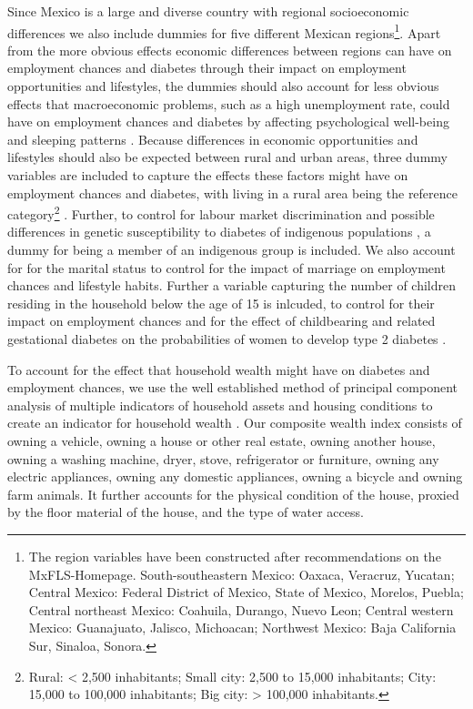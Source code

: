 Since Mexico is a large and diverse country with regional socioeconomic differences
we also include dummies for five different Mexican regions\footnote{The region variables have been constructed after recommendations on
the MxFLS-Homepage. South-southeastern Mexico: Oaxaca, Veracruz, Yucatan;
Central Mexico: Federal District of Mexico, State of Mexico, Morelos,
Puebla; Central northeast Mexico: Coahuila, Durango, Nuevo Leon; Central
western Mexico: Guanajuato, Jalisco, Michoacan; Northwest Mexico:
Baja California Sur, Sinaloa, Sonora.}. Apart from the more obvious effects economic differences between
regions can have on employment chances and diabetes through their
impact on employment opportunities and lifestyles, the dummies should
also account for less obvious effects that macroeconomic problems,
such as a high unemployment rate, could have on employment chances
and diabetes by affecting psychological well-being and sleeping patterns
\parencite{Antillon2014}. Because differences in economic opportunities
and lifestyles should also be expected between rural and urban areas,
three dummy variables are included to capture the effects these factors
might have on employment chances and diabetes, with living in a rural
area being the reference category\footnote{Rural: < 2,500 inhabitants; Small city: 2,500 to 15,000 inhabitants;
City: 15,000 to 100,000 inhabitants; Big city: > 100,000 inhabitants. } \parencite{Villalpando2010}. Further, to control for labour market discrimination
and possible differences in genetic susceptibility to diabetes of
indigenous populations \parencite{Yu2007}, a dummy for being a member
of an indigenous group is included. We also account for for the marital
status to control for the impact of marriage on employment chances
and lifestyle habits. Further a variable capturing the number of children
residing in the household below the age of 15 is inlcuded, to control
for their impact on employment chances and for the effect of childbearing
and related gestational diabetes on the probabilities of women to
develop type 2 diabetes \parencite{Bellamy2009}. 

To account for the effect that household wealth might have on diabetes and employment chances,
we use the well established method of principal component analysis
of multiple indicators of household assets and housing conditions
to create an indicator for household wealth \parencite{Filmer2001}. Our
composite wealth index consists of owning a vehicle, owning a house
or other real estate, owning another house, owning a washing machine,
dryer, stove, refrigerator or furniture, owning any electric appliances,
owning any domestic appliances, owning a bicycle and owning farm animals.
It further accounts for the physical condition of the house, proxied
by the floor material of the house, and the type of water access. 

